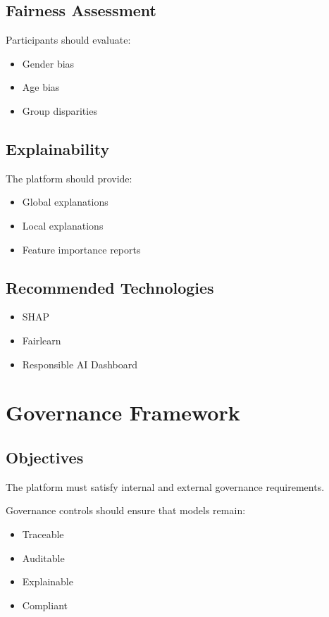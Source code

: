 \subsection{Fairness Assessment}

Participants should evaluate:

\begin{itemize}
    \item Gender bias
    \item Age bias
    \item Group disparities
\end{itemize}

\subsection{Explainability}

The platform should provide:

\begin{itemize}
    \item Global explanations
    \item Local explanations
    \item Feature importance reports
\end{itemize}

\subsection{Recommended Technologies}

\begin{itemize}
    \item SHAP
    \item Fairlearn
    \item Responsible AI Dashboard
\end{itemize}

\section{Governance Framework}

\subsection{Objectives}

The platform must satisfy internal and external governance requirements.

Governance controls should ensure that models remain:

\begin{itemize}
    \item Traceable
    \item Auditable
    \item Explainable
    \item Compliant
\end{itemize}

